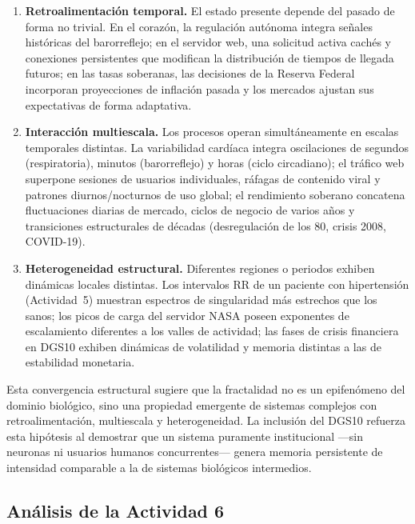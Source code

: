 \begin{enumerate}[leftmargin=2em]
    \item \textbf{Retroalimentación temporal.} El estado presente depende del
          pasado de forma no trivial. En el corazón, la regulación autónoma
          integra señales históricas del barorreflejo; en el servidor web, una
          solicitud activa cachés y conexiones persistentes que modifican la
          distribución de tiempos de llegada futuros; en las tasas soberanas,
          las decisiones de la Reserva Federal incorporan proyecciones de
          inflación pasada y los mercados ajustan sus expectativas de forma
          adaptativa.
    \item \textbf{Interacción multiescala.} Los procesos operan simultáneamente
          en escalas temporales distintas. La variabilidad cardíaca integra
          oscilaciones de segundos (respiratoria), minutos (barorreflejo) y
          horas (ciclo circadiano); el tráfico web superpone sesiones de
          usuarios individuales, ráfagas de contenido viral y patrones
          diurnos/nocturnos de uso global; el rendimiento soberano concatena
          fluctuaciones diarias de mercado, ciclos de negocio de varios años y
          transiciones estructurales de décadas (desregulación de los 80,
          crisis 2008, COVID-19).
    \item \textbf{Heterogeneidad estructural.} Diferentes regiones o periodos
          exhiben dinámicas locales distintas. Los intervalos RR de un paciente
          con hipertensión (Actividad~5) muestran espectros de singularidad más
          estrechos que los sanos; los picos de carga del servidor NASA poseen
          exponentes de escalamiento diferentes a los valles de actividad; las
          fases de crisis financiera en DGS10 exhiben dinámicas de volatilidad
          y memoria distintas a las de estabilidad monetaria.
\end{enumerate}

Esta convergencia estructural sugiere que la fractalidad no es un epifenómeno
del dominio biológico, sino una propiedad emergente de sistemas complejos con
retroalimentación, multiescala y heterogeneidad. La inclusión del DGS10 refuerza
esta hipótesis al demostrar que un sistema puramente institucional ---sin
neuronas ni usuarios humanos concurrentes--- genera memoria persistente de
intensidad comparable a la de sistemas biológicos intermedios.

\subsection{Análisis de la Actividad 6}

